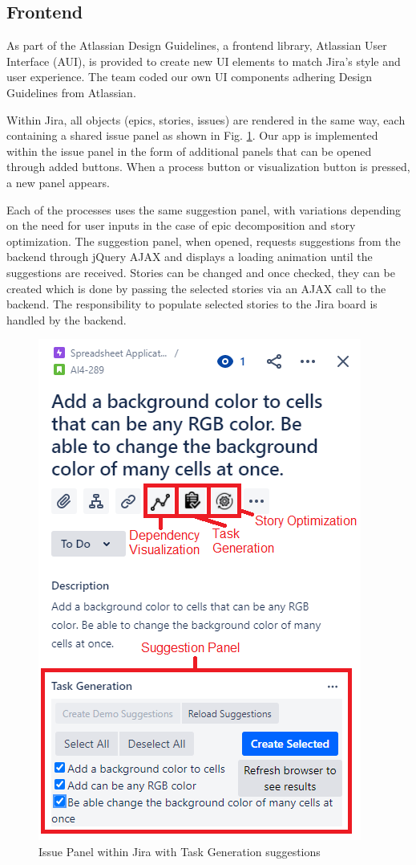 \subsection{Frontend}

As part of the Atlassian Design Guidelines\cite{jira3}, a frontend library, Atlassian User Interface (AUI)\cite{jira4}, is provided to create new UI elements to match Jira’s style and user experience. The team coded our own UI components adhering Design Guidelines from Atlassian.

Within Jira, all objects (epics, stories, issues) are rendered in the same way, each containing a shared issue panel as shown in Fig. \ref{fig:issueView}. Our app is implemented within the issue panel in the form of additional panels that can be opened through added buttons. When a process button or visualization button is pressed, a new panel appears.

Each of the processes uses the same suggestion panel, with variations depending on the need for user inputs in the case of epic decomposition and story optimization. The suggestion panel, when opened, requests suggestions from the backend through jQuery AJAX\cite{ajax} and displays a loading animation until the suggestions are received. Stories can be changed and once checked, they can be created which is done by passing the selected stories via an AJAX call to the backend. The responsibility to populate selected stories to the Jira board is handled by the backend.

\begin{figure}
\centering
\includegraphics[width=.5\textwidth,keepaspectratio]{./figure/Frontend.png}
\caption{Issue Panel within Jira with Task Generation suggestions }
\label{fig:issueView}
\end{figure}

